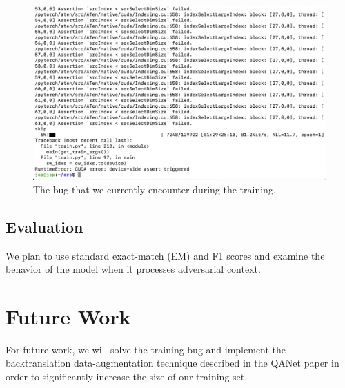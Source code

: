 \documentclass{article}
\begin{document}
\begin{figure}[h]
\centering
\includegraphics[scale=0.5]{bug}
\caption{The bug that we currently encounter during the training.}
\end{figure}

\subsection{Evaluation}
We plan to use standard exact-match (EM) and F1 scores and examine the behavior of the model when it processes adversarial context.  



\section{Future Work}
For future work, we will solve the training bug and implement the backtranslation data-augmentation technique described in the QANet paper in order to significantly increase the size of our training set.



\end{document}
